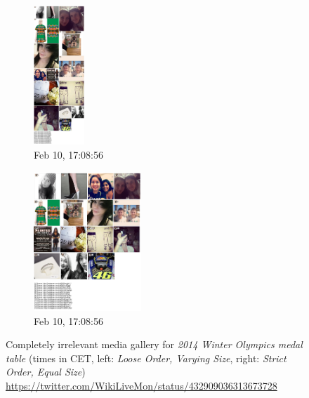 \documentclass{sig-alternate}
\newcommand{\inlinelistingsize}{\fontsize{8pt}{11pt}}
\let\oldurl\url
\renewcommand{\url}[1]{\inlinelistingsize\oldurl{#1}}
\begin{document}
\begin{figure}[p!]
  \centering
  \begin{subfigure}[t]{0.25\textwidth}
    \includegraphics[height=5.25cm]{figures/medal_table/mediagallery_looseOrder_1392048536608.png}
    \caption{Feb 10, 17:08:56}
    \label{fig:1392048536608}
  \end{subfigure}%
  \begin{subfigure}[t]{0.25\textwidth}
    \includegraphics[height=5.25cm]{figures/medal_table/mediagallery_strictOrder_1392048536209.png}
    \caption{Feb 10, 17:08:56}
    \label{fig:1392048536209}
  \end{subfigure}
  \caption{Completely irrelevant media gallery for
    \emph{2014 Winter Olympics medal table}
    (times in CET, left: \emph{Loose Order, Varying Size},
    right: \emph{Strict Order, Equal Size})    
    \url{https://twitter.com/WikiLiveMon/status/432909036313673728}}
  \label{fig:medal-table}
\end{figure}



\balancecolumns
\end{document}

